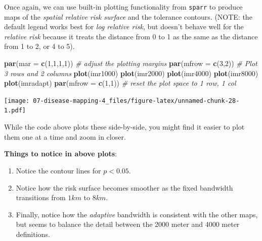 \documentclass[
]{book}
\newenvironment{Shaded}{\begin{snugshade}}{\end{snugshade}}
\newcommand{\AttributeTok}[1]{\textcolor[rgb]{0.13,0.29,0.53}{#1}}
\newcommand{\CommentTok}[1]{\textcolor[rgb]{0.56,0.35,0.01}{\textit{#1}}}
\newcommand{\DecValTok}[1]{\textcolor[rgb]{0.00,0.00,0.81}{#1}}
\newcommand{\FunctionTok}[1]{\textcolor[rgb]{0.13,0.29,0.53}{\textbf{#1}}}
\newcommand{\NormalTok}[1]{#1}
\providecommand{\tightlist}{%
  \setlength{\itemsep}{0pt}\setlength{\parskip}{0pt}}
\newenvironment{rmdnote}[1]
  {
  \begin{itemize}
  \renewcommand{\labelitemi}{
    \raisebox{-.7\height}[0pt][0pt]{
      {\setkeys{Gin}{width=3em,keepaspectratio}\texttt{[image: images/\#1]}}
    }
  }
  \setlength{\fboxsep}{1em}
  \begin{note}
  \item
  }
  {
  \end{note}
  \end{itemize}
  }
\begin{document}
Once again, we can use built-in plotting functionality from \texttt{sparr} to produce maps of the \emph{spatial relative risk surface} and the tolerance contours. (NOTE: the default legend works best for \emph{log relative risk}, but doesn't behave well for the \emph{relative risk} because it treats the distance from 0 to 1 as the same as the distance from 1 to 2, or 4 to 5).

\begin{Shaded}
\begin{Highlighting}[]
\FunctionTok{par}\NormalTok{(}\AttributeTok{mar =} \FunctionTok{c}\NormalTok{(}\DecValTok{1}\NormalTok{,}\DecValTok{1}\NormalTok{,}\DecValTok{1}\NormalTok{,}\DecValTok{1}\NormalTok{)) }\CommentTok{\# adjust the plotting margins}
\FunctionTok{par}\NormalTok{(}\AttributeTok{mfrow =} \FunctionTok{c}\NormalTok{(}\DecValTok{3}\NormalTok{,}\DecValTok{2}\NormalTok{))   }\CommentTok{\# Plot 3 rows and 2 columns}
\FunctionTok{plot}\NormalTok{(imr1000)}
\FunctionTok{plot}\NormalTok{(imr2000)}
\FunctionTok{plot}\NormalTok{(imr4000)}
\FunctionTok{plot}\NormalTok{(imr8000)}
\FunctionTok{plot}\NormalTok{(imradapt)}
\FunctionTok{par}\NormalTok{(}\AttributeTok{mfrow =} \FunctionTok{c}\NormalTok{(}\DecValTok{1}\NormalTok{,}\DecValTok{1}\NormalTok{))  }\CommentTok{\# reset the plot space to 1 row, 1 col}
\end{Highlighting}
\end{Shaded}

\texttt{[image: 07-disease-mapping-4\_files/figure-latex/unnamed-chunk-28-1.pdf]}

While the code above plots these side-by-side, you might find it easier to plot them one at a time and zoom in closer.

\begin{rmdnote}{note}

\textbf{Things to notice in above plots}:

\begin{enumerate}
\def\labelenumi{\arabic{enumi}.}
\tightlist
\item
  Notice the contour lines for \(p<0.05\).\\
\item
  Notice how the risk surface becomes smoother as the fixed bandwidth transitions from \(1km\) to \(8km\).
\item
  Finally, notice how the \emph{adaptive} bandwidth is consistent with the other maps, but seems to balance the detail between the 2000 meter and 4000 meter definitions.
\end{enumerate}

\end{rmdnote}
\end{document}
